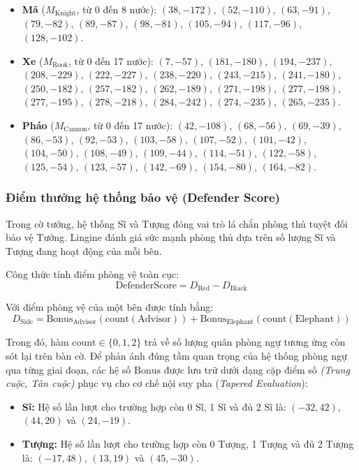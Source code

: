 \begin{itemize}
    \item \textbf{Mã} ($M_{\text{Knight}}$, từ 0 đến 8 nước): $(38, -172)$, $(52, -110)$, $(63, -91)$, $(79, -82)$, $(89, -87)$, $(98, -81)$, $(105, -94)$, $(117, -96)$, $(128, -102)$.
    
    \item \textbf{Xe} ($M_{\text{Rook}}$, từ 0 đến 17 nước): $(7, -57)$, $(181, -180)$, $(194, -237)$, $(208, -229)$, $(222, -227)$, $(238, -220)$, $(243, -215)$, $(241, -180)$, $(250, -182)$, $(257, -182)$, $(262, -189)$, $(271, -198)$, $(277, -198)$, $(277, -195)$, $(278, -218)$, $(284, -242)$, $(274, -235)$, $(265, -235)$.
    
    \item \textbf{Pháo} ($M_{\text{Cannon}}$, từ 0 đến 17 nước): $(42, -108)$, $(68, -56)$, $(69, -39)$, $(86, -53)$, $(92, -53)$, $(103, -58)$, $(107, -52)$, $(101, -42)$, $(104, -50)$, $(108, -49)$, $(109, -44)$, $(114, -51)$, $(122, -58)$, $(125, -54)$, $(123, -57)$, $(142, -69)$, $(154, -80)$, $(164, -82)$.
\end{itemize}

\subsubsection{Điểm thưởng hệ thống bảo vệ (Defender Score)}

Trong cờ tướng, hệ thống Sĩ và Tượng đóng vai trò lá chắn phòng thủ tuyệt đối bảo vệ Tướng. Lingine đánh giá sức mạnh phòng thủ dựa trên số lượng Sĩ và Tượng đang hoạt động của mỗi bên.

Công thức tính điểm phòng vệ toàn cục:
\[ \text{DefenderScore} = D_{\text{Red}} - D_{\text{Black}} \]

Với điểm phòng vệ của một bên được tính bằng:
\[ D_{\text{Side}} = \text{Bonus}_{\text{Advisor}}(\text{count}(\text{Advisor})) + \text{Bonus}_{\text{Elephant}}(\text{count}(\text{Elephant})) \]

Trong đó, hàm $\text{count} \in \{0, 1, 2\}$ trả về số lượng quân phòng ngự tương ứng còn sót lại trên bàn cờ. Để phản ánh đúng tầm quan trọng của hệ thống phòng ngự qua từng giai đoạn, các hệ số $\text{Bonus}$ được lưu trữ dưới dạng cặp điểm số \textit{(Trung cuộc, Tàn cuộc)} phục vụ cho cơ chế nội suy pha (\textit{Tapered Evaluation}):

\begin{itemize}
    \item \textbf{Sĩ:} 
    Hệ số lần lượt cho trường hợp còn 0 Sĩ, 1 Sĩ và đủ 2 Sĩ là: $(-32, 42)$, $(44, 20)$ và $(24, -19)$.
    
    \item \textbf{Tượng:} 
    Hệ số lần lượt cho trường hợp còn 0 Tượng, 1 Tượng và đủ 2 Tượng là: $(-17, 48)$, $(13, 19)$ và $(45, -30)$.
\end{itemize}

